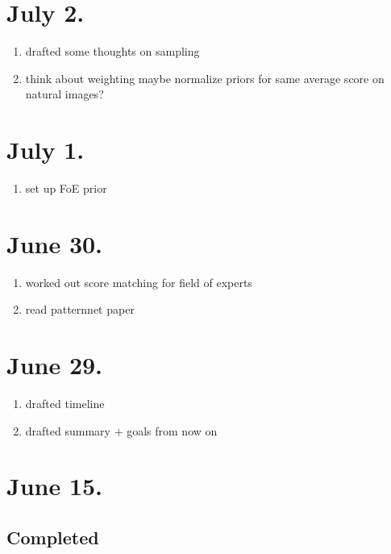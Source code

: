 \documentclass{article}
\begin{document}
\section*{July 2.}

\begin{enumerate}
	\item drafted some thoughts on sampling
	\item think about weighting maybe normalize priors for same average score on natural images?
\end{enumerate}

\section*{July 1.}

\begin{enumerate}
	\item set up FoE prior
\end{enumerate}


\section*{June 30.}

\begin{enumerate}
	\item worked out score matching for field of experts 
	\item read patternnet paper	
\end{enumerate}

\section*{June 29.}

\begin{enumerate}
	\item drafted timeline
	\item drafted summary + goals from now on
\end{enumerate}

\section*{June 15.}

\subsection*{Completed}
\end{document}
